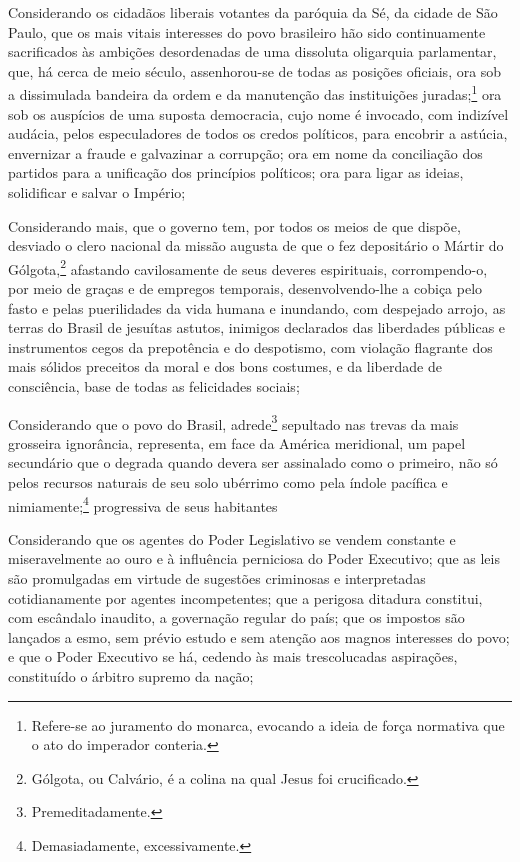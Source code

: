 Considerando os cidadãos liberais votantes da paróquia da Sé, da cidade
de São Paulo, que os mais vitais interesses do povo brasileiro hão sido
continuamente sacrificados às ambições desordenadas de uma dissoluta
oligarquia parlamentar, que, há cerca de meio século, assenhorou-se de
todas as posições oficiais, ora sob a dissimulada bandeira da ordem e da
manutenção das instituições juradas;\footnote{Refere-se ao juramento do
  monarca, evocando a ideia de força normativa que o ato do imperador
  conteria.} ora sob os auspícios de uma suposta democracia, cujo nome
é invocado, com indizível audácia, pelos especuladores de todos os
credos políticos, para encobrir a astúcia, envernizar a fraude e
galvazinar a corrupção; ora em nome da conciliação dos partidos para a
unificação dos princípios políticos; ora para ligar as ideias,
solidificar e salvar o Império;

Considerando mais, que o governo tem, por todos os meios de que dispõe,
desviado o clero nacional da missão augusta de que o fez depositário o
Mártir do Gólgota,\footnote{Gólgota, ou Calvário, é a colina na qual
  Jesus foi crucificado.} afastando cavilosamente de seus deveres
espirituais, corrompendo-o, por meio de graças e de empregos temporais,
desenvolvendo-lhe a cobiça pelo fasto e pelas puerilidades da vida
humana e inundando, com despejado arrojo, as terras do Brasil de
jesuítas astutos, inimigos declarados das liberdades públicas e
instrumentos cegos da prepotência e do despotismo, com violação
flagrante dos mais sólidos preceitos da moral e dos bons costumes, e da
liberdade de consciência, base de todas as felicidades sociais;

Considerando que o povo do Brasil, adrede\footnote{Premeditadamente.}
sepultado nas trevas da mais grosseira ignorância, representa, em face
da América meridional, um papel secundário que o degrada quando devera
ser assinalado como o primeiro, não só pelos recursos naturais de seu
solo ubérrimo como pela índole pacífica e nimiamente;\footnote{
  Demasiadamente, excessivamente.} progressiva de seus habitantes

Considerando que os agentes do Poder Legislativo se vendem constante e
miseravelmente ao ouro e à influência perniciosa do Poder Executivo; que
as leis são promulgadas em virtude de sugestões criminosas e
interpretadas cotidianamente por agentes incompetentes; que a perigosa
ditadura constitui, com escândalo inaudito, a governação regular do
país; que os impostos são lançados a esmo, sem prévio estudo e sem
atenção aos magnos interesses do povo; e que o Poder Executivo se há,
cedendo às mais trescolucadas aspirações, constituído o árbitro supremo
da nação;

